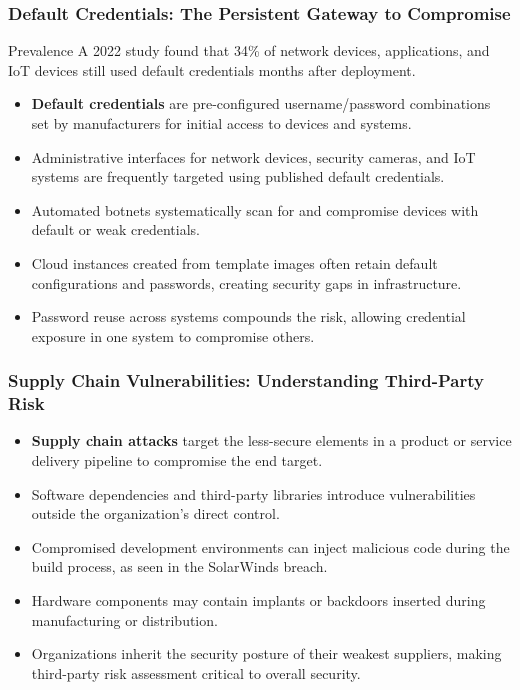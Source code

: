 \documentclass{beamer}
\begin{document}
\begin{frame}
    \frametitle{Default Credentials: The Persistent Gateway to Compromise}
    
    \begin{block}{Prevalence}
        A 2022 study found that 34\% of network devices, applications, and IoT devices still used default credentials months after deployment.
    \end{block}
    
    \begin{itemize}
        \item \textbf{Default credentials} are pre-configured username/password combinations set by manufacturers for initial access to devices and systems.
        \item Administrative interfaces for network devices, security cameras, and IoT systems are frequently targeted using published default credentials.
        \item Automated botnets systematically scan for and compromise devices with default or weak credentials.
        \item Cloud instances created from template images often retain default configurations and passwords, creating security gaps in infrastructure.
        \item Password reuse across systems compounds the risk, allowing credential exposure in one system to compromise others.
    \end{itemize}
\end{frame}

\begin{frame}
    \frametitle{Supply Chain Vulnerabilities: Understanding Third-Party Risk}
    
    \begin{itemize}
        \item \textbf{Supply chain attacks} target the less-secure elements in a product or service delivery pipeline to compromise the end target.
        \item Software dependencies and third-party libraries introduce vulnerabilities outside the organization's direct control.
        \item Compromised development environments can inject malicious code during the build process, as seen in the SolarWinds breach.
        \item Hardware components may contain implants or backdoors inserted during manufacturing or distribution.
        \item Organizations inherit the security posture of their weakest suppliers, making third-party risk assessment critical to overall security.
    \end{itemize}
\end{frame}
\end{document}
